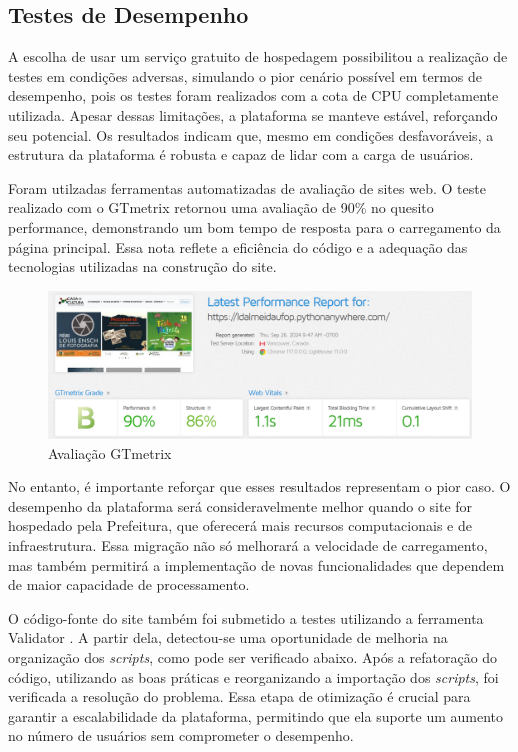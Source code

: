 \subsection{Testes de Desempenho}

A escolha de usar um serviço gratuito de hospedagem possibilitou a realização de testes em condições adversas, simulando o pior cenário possível em termos de desempenho, pois os testes foram realizados com a cota de CPU completamente utilizada. Apesar dessas limitações, a plataforma se manteve estável, reforçando seu potencial. Os resultados indicam que, mesmo em condições desfavoráveis, a estrutura da plataforma é robusta e capaz de lidar com a carga de usuários.

Foram utilzadas ferramentas automatizadas de avaliação de sites web. O teste realizado com o GTmetrix \cite{GTMetrix} retornou uma avaliação de 90\% no quesito performance, demonstrando um bom tempo de resposta para o carregamento da página principal. Essa nota reflete a eficiência do código e a adequação das tecnologias utilizadas na construção do site.

\begin{figure}[htb] \caption{\label{fig_grafico}Avaliação GTmetrix} \begin{center} \includegraphics[scale=0.3]{./img/gtmetrix.png} \end{center}  \end{figure}

No entanto, é importante reforçar que esses resultados representam o pior caso. O desempenho da plataforma será consideravelmente melhor quando o site for hospedado pela Prefeitura, que oferecerá mais recursos computacionais e de infraestrutura. Essa migração não só melhorará a velocidade de carregamento, mas também permitirá a implementação de novas funcionalidades que dependem de maior capacidade de processamento.

O código-fonte do site também foi submetido a testes utilizando a ferramenta Validator \cite{Validator}. A partir dela, detectou-se uma oportunidade de melhoria na organização dos \textit{scripts}, como pode ser verificado abaixo. Após a refatoração do código, utilizando as boas práticas e reorganizando a importação dos \textit{scripts}, foi verificada a resolução do problema. Essa etapa de otimização é crucial para garantir a escalabilidade da plataforma, permitindo que ela suporte um aumento no número de usuários sem comprometer o desempenho.

